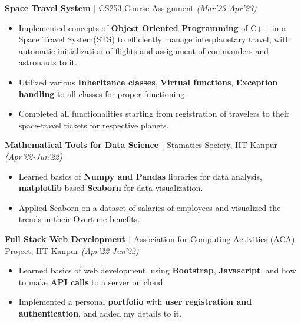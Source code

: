 \documentclass[10pt,a4paper]{extarticle}
\begin{document}
\vspace{-1.6mm}
{\begin{tcolorbox}[colback=lgrey,height=6mm]\textbf{
\href{https://github.com/Deepanshu18099/Space-Travel-System.git}{Space Travel System {\faGithub}}}
{\(|\) CS253 Course-Assignment }
\hfill \textit{(Mar'23-Apr'23)}
\end{tcolorbox}}
\vspace{-3mm}
\begin{itemize}
\item  Implemented concepts of \textbf{Object Oriented Programming} of C++ in a Space Travel System(STS) to efficiently manage interplanetary travel, with automatic initialization of flights and assignment of commanders and astronauts to it.
\item Utilized various \textbf{Inheritance classes}, \textbf{Virtual functions}, \textbf{Exception handling} to all classes for proper functioning.
\item Completed all functionalities starting from registration of travelers to their space-travel tickets for respective planets.
\end{itemize}

\vspace{-1.6mm}
{\begin{tcolorbox}[colback=lgrey,height=6mm]\textbf{
\href{https://github.com/Deepanshu18099/Mathematical-Tools-for-Data-Science/tree/main}{Mathematical Tools for Data Science {\faGithub}}}
{\(|\) Stamatics Society, IIT Kanpur}
\hfill \textit{(Apr'22-Jun'22)}
\end{tcolorbox}}
\vspace{-3.2mm}
\begin{itemize}
\item Learned basics of \textbf{Numpy and Pandas} libraries for data analysis, \textbf{matplotlib} based \textbf{Seaborn} for data visualization.
\item Applied Seaborn on a dataset of salaries of employees and visualized the trends in their Overtime benefits. 
\end{itemize}

\vspace{-1.6mm}
{\begin{tcolorbox}[colback=lgrey,height=6mm]\textbf{
\href{https://github.com/Deepanshu18099/ACA_FSWD_2022}{Full Stack Web Development {\faGithub}}}
{\(|\) Association for Computing Activities (ACA) Project, IIT Kanpur}
\hfill \textit{(Apr'22-Jun'22)}
\end{tcolorbox}}
\vspace{-3.2mm}
\begin{itemize}
\item Learned basics of web development, using \textbf{Bootstrap}, \textbf{Javascript}, and how to make \textbf{API calls} to a server on cloud.
\item Implemented a personal \textbf{portfolio} with \textbf{user registration and authentication}, and added my details to it.
\end{itemize}
\end{document}
